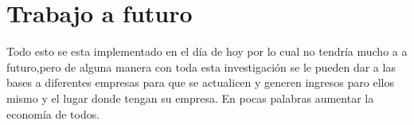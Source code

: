 \documentclass{bmcart}
\begin{document}
\section*{Trabajo a futuro}
Todo esto se esta implementado en el día de hoy por lo cual no tendría mucho a a futuro,pero de alguna manera con toda esta investigación se le pueden dar a las bases a diferentes empresas para que se actualicen y generen ingresos paro ellos mismo y el lugar donde tengan su empresa. En pocas palabras aumentar la economía de todos.   

\end{document}

